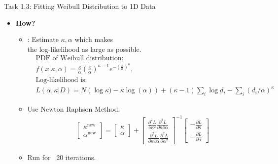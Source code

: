 \documentclass{beamer}
\begin{document}
\begin{frame}{Task 1.3: Fitting Weibull Distribution to 1D Data}
\begin{itemize}
	\item \textbf{How?} 
	\begin{itemize}
		\item {}: Estimate $\kappa, \alpha$ which makes \\ the log-likelihood as large as possible.
		\begin{align*}
		&\text{PDF of Weibull distribution: }\\
		&f(x|\kappa, \alpha)=\frac{\kappa}{\alpha}\left(\frac{x}{\alpha} \right)^{\kappa-1}e^{-\left( \frac{x}{\alpha}\right)^\kappa}, \\ 
		&\text{Log-likelihood is:} \\
		& L(\alpha,\kappa|D) = N\left( \log\kappa)-\kappa\log(\alpha)\right) + \left( \kappa-1\right) \sum_i{\log d_i} - \sum_i{\left( d_i/\alpha \right)^\kappa }  
		\end{align*}
		\vspace{-0.5cm}
		\item{Use Newton Raphson Method:} \\
		\vspace{-0.5cm}		
		\begin{align*}
		&\begin{bmatrix}
			\kappa^\text{new} \\[6pt]
			\alpha^\text{new}
		\end{bmatrix}
		=
		\begin{bmatrix}
		\kappa\\[6pt]
		\alpha
		\end{bmatrix}
		+
		\begin{bmatrix}
			\frac{\partial^2 L}{\partial \kappa^2} 	\frac{\partial^2 L}{\partial \kappa \partial \alpha}   \\[6pt]
			\frac{\partial^2 L}{\partial \kappa \partial \alpha}  \frac{\partial^2 L}{\partial \alpha^2}
		\end{bmatrix} ^{-1}
		\begin{bmatrix}
		-\frac{\partial L}{\partial \kappa}  \\[6pt]
		-\frac{\partial L}{\partial \alpha}
		\end{bmatrix} 
		\end{align*}
	\item{Run for ~20 iterations.} \\	
	\end{itemize}	
\end{itemize}
\end{frame}
\end{document}
